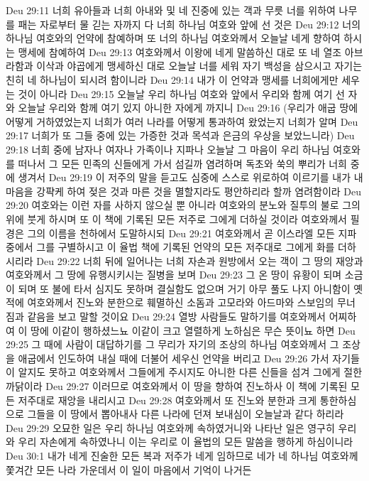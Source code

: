 Deu 29:11  너희 유아들과 너희 아내와 및 네 진중에 있는 객과 무릇 너를 위하여 나무를 패는 자로부터 물 긷는 자까지 다 너희 하나님 여호와 앞에 선 것은
Deu 29:12  너의 하나님 여호와의 언약에 참예하며 또 너의 하나님 여호와께서 오늘날 네게 향하여 하시는 맹세에 참예하여
Deu 29:13  여호와께서 이왕에 네게 말씀하신 대로 또 네 열조 아브라함과 이삭과 야곱에게 맹세하신 대로 오늘날 너를 세워 자기 백성을 삼으시고 자기는 친히 네 하나님이 되시려 함이니라
Deu 29:14  내가 이 언약과 맹세를 너희에게만 세우는 것이 아니라
Deu 29:15  오늘날 우리 하나님 여호와 앞에서 우리와 함께 여기 선 자와 오늘날 우리와 함께 여기 있지 아니한 자에게 까지니
Deu 29:16  (우리가 애굽 땅에 어떻게 거하였었는지 너희가 여러 나라를 어떻게 통과하여 왔었는지 너희가 알며
Deu 29:17  너희가 또 그들 중에 있는 가증한 것과 목석과 은금의 우상을 보았느니라)
Deu 29:18  너희 중에 남자나 여자나 가족이나 지파나 오늘날 그 마음이 우리 하나님 여호와를 떠나서 그 모든 민족의 신들에게 가서 섬길까 염려하며 독초와 쑥의 뿌리가 너희 중에 생겨서
Deu 29:19  이 저주의 말을 듣고도 심중에 스스로 위로하여 이르기를 내가 내 마음을 강퍅케 하여 젖은 것과 마른 것을 멸할지라도 평안하리라 할까 염려함이라
Deu 29:20  여호와는 이런 자를 사하지 않으실 뿐 아니라 여호와의 분노와 질투의 불로 그의 위에 붓게 하시며 또 이 책에 기록된 모든 저주로 그에게 더하실 것이라 여호와께서 필경은 그의 이름을 천하에서 도말하시되
Deu 29:21  여호와께서 곧 이스라엘 모든 지파 중에서 그를 구별하시고 이 율법 책에 기록된 언약의 모든 저주대로 그에게 화를 더하시리라
Deu 29:22  너희 뒤에 일어나는 너희 자손과 원방에서 오는 객이 그 땅의 재앙과 여호와께서 그 땅에 유행시키시는 질병을 보며
Deu 29:23  그 온 땅이 유황이 되며 소금이 되며 또 불에 타서 심지도 못하며 결실함도 없으며 거기 아무 풀도 나지 아니함이 옛적에 여호와께서 진노와 분한으로 훼멸하신 소돔과 고모라와 아드마와 스보임의 무너짐과 같음을 보고 말할 것이요
Deu 29:24  열방 사람들도 말하기를 여호와께서 어찌하여 이 땅에 이같이 행하셨느뇨 이같이 크고 열렬하게 노하심은 무슨 뜻이뇨 하면
Deu 29:25  그 때에 사람이 대답하기를 그 무리가 자기의 조상의 하나님 여호와께서 그 조상을 애굽에서 인도하여 내실 때에 더불어 세우신 언약을 버리고
Deu 29:26  가서 자기들이 알지도 못하고 여호와께서 그들에게 주시지도 아니한 다른 신들을 섬겨 그에게 절한 까닭이라
Deu 29:27  이러므로 여호와께서 이 땅을 향하여 진노하사 이 책에 기록된 모든 저주대로 재앙을 내리시고
Deu 29:28  여호와께서 또 진노와 분한과 크게 통한하심으로 그들을 이 땅에서 뽑아내사 다른 나라에 던져 보내심이 오늘날과 같다 하리라
Deu 29:29  오묘한 일은 우리 하나님 여호와께 속하였거니와 나타난 일은 영구히 우리와 우리 자손에게 속하였나니 이는 우리로 이 율법의 모든 말씀을 행하게 하심이니라
Deu 30:1  내가 네게 진술한 모든 복과 저주가 네게 임하므로 네가 네 하나님 여호와께 쫓겨간 모든 나라 가운데서 이 일이 마음에서 기억이 나거든
